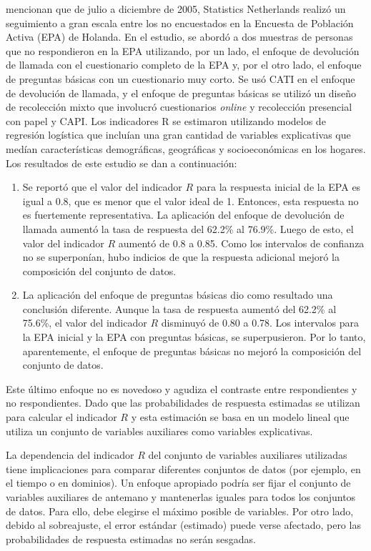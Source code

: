 \documentclass[
  12pt,
]{book}
\providecommand{\tightlist}{%
  \setlength{\itemsep}{0pt}\setlength{\parskip}{0pt}}
\begin{document}
\citet{Bethlehem_Cobben_Schouten_2009} mencionan que de julio a diciembre de 2005, Statistics Netherlands realizó un seguimiento a gran escala entre los no encuestados en la Encuesta de Población Activa (EPA) de Holanda. En el estudio, se abordó a dos muestras de personas que no respondieron en la EPA utilizando, por un lado, el enfoque de devolución de llamada con el cuestionario completo de la EPA y, por el otro lado, el enfoque de preguntas básicas con un cuestionario muy corto. Se usó CATI en el enfoque de devolución de llamada, y el enfoque de preguntas básicas se utilizó un diseño de recolección mixto que involucró cuestionarios \emph{online} y recolección presencial con papel y CAPI. Los indicadores R se estimaron utilizando modelos de regresión logística que incluían una gran cantidad de variables explicativas que medían características demográficas, geográficas y socioeconómicas en los hogares. Los resultados de este estudio se dan a continuación:

\begin{enumerate}
\def\labelenumi{\arabic{enumi}.}
\tightlist
\item
  Se reportó que el valor del indicador \(R\) para la respuesta inicial de la EPA es igual a 0.8, que es menor que el valor ideal de 1. Entonces, esta respuesta no es fuertemente representativa. La aplicación del enfoque de devolución de llamada aumentó la
  tasa de respuesta del 62.2\% al 76.9\%. Luego de esto, el valor del indicador \(R\) aumentó de 0.8 a 0.85. Como los intervalos de confianza no se superponían, hubo indicios de que la respuesta adicional mejoró la composición del conjunto de datos.
\item
  La aplicación del enfoque de preguntas básicas dio como resultado
  una conclusión diferente. Aunque la tasa de respuesta aumentó del 62.2\% al 75.6\%, el valor del indicador \(R\) disminuyó de 0.80 a 0.78. Los intervalos para la EPA inicial y la EPA con preguntas básicas, se superpusieron. Por lo tanto, aparentemente, el enfoque de preguntas básicas no mejoró la composición del conjunto de datos.
\end{enumerate}

Este último enfoque no es novedoso y agudiza el contraste entre respondientes y no respondientes. Dado que las probabilidades de respuesta estimadas se utilizan para calcular
el indicador \(R\) y esta estimación se basa en un modelo lineal que utiliza un conjunto de variables auxiliares como variables explicativas.

La dependencia del indicador \(R\) del conjunto de variables auxiliares utilizadas tiene implicaciones para comparar diferentes conjuntos de datos (por ejemplo, en el tiempo o en dominios). Un enfoque apropiado podría ser fijar el conjunto de variables auxiliares de antemano y mantenerlas iguales para todos los conjuntos de datos. Para ello, debe elegirse el máximo posible de variables. Por otro lado, debido al sobreajuste, el error estándar (estimado) puede verse
afectado, pero las probabilidades de respuesta estimadas no serán sesgadas.
\end{document}
